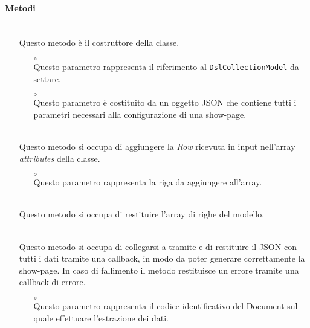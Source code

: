 \paragraph*{Metodi}
\begin{itemize}
\item[]  \\ Questo metodo è il costruttore della classe.
\begin{itemize}\addtolength{\itemsep}{-0.5\baselineskip}
\item[$\circ$]  \\ Questo parametro rappresenta il riferimento al \texttt{DslCollectionModel} da settare.
\item[$\circ$]  \\ Questo parametro è costituito da un oggetto JSON che contiene tutti i parametri necessari alla configurazione di una show-page.
\end{itemize}
\item[]  \\ Questo metodo si occupa di aggiungere la \textit{Row} ricevuta in input nell'array \textit{attributes} della classe.
\begin{itemize}\addtolength{\itemsep}{-0.5\baselineskip}
\item[$\circ$]  \\ Questo parametro rappresenta la riga da aggiungere all'array.
\end{itemize}
\item[]  \\ Questo metodo si occupa di restituire l'array di righe del modello.
\item[]  \\ Questo metodo si occupa di collegarsi a  tramite  e di restituire il JSON con tutti i dati tramite una callback, in modo da poter generare correttamente la show-page. In caso di fallimento il metodo restituisce un errore tramite una callback di errore.
\begin{itemize}\addtolength{\itemsep}{-0.5\baselineskip}
\item[$\circ$]  \\ Questo parametro rappresenta il codice identificativo del Document sul quale effettuare l'estrazione dei dati.

\end{itemize}
\end{itemize}
